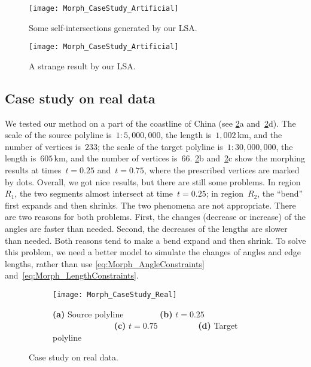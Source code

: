 \begin{figure}[tb]
	\centering	
	\texttt{[image: Morph\_CaseStudy\_Artificial]}
	\caption{Some self-intersections generated by our LSA.}
	\label{fig:Morph_DataComplex}
\par\vspace{\intextsep} %
	\centering	
	\texttt{[image: Morph\_CaseStudy\_Artificial]}
	\caption{A strange result by our LSA.}
	\label{fig:Morph_ExtraVertices}
\end{figure}

\subsection{Case study on real data}
\label{sec:Morph_CaseStudy}

We tested our method on a part of the coastline of China 
(see \figs\ref{fig:Morph_RealData}a 
and~\ref{fig:Morph_RealData}d). 
The scale of the source polyline is~$1:5{,}000{,}000$,
the length is~$1{,}002\,$km, 
and the number of vertices is~$233$; 
the scale of the target polyline is~$1:30{,}000{,}000$, 
the length is~$605\,$km, 
and the number of vertices is~$66$. 
%
\figs\ref{fig:Morph_RealData}b and~\ref{fig:Morph_RealData}c
show the morphing results
at times~$t = 0.25$ and~$t = 0.75$,
where the prescribed vertices are marked by dots. 
Overall, we got nice results, 
but there are still some problems. 
In region~$R_{1}$, the two segments almost 
intersect at time~$t = 0.25$; 
in region~$R_{2}$, 
the ``bend'' first expands and then shrinks. 
The two phenomena are not appropriate. 
There are two reasons for both problems. 
First, the changes (decrease or increase) of the angles 
are faster than needed. 
Second, the decreases of the lengths are slower than needed. 
Both reasons tend to make a bend expand and then shrink. 
To solve this problem, we need a better model to 
simulate the changes of angles and edge lengths,
rather than use \eqs\ref{eq:Morph_AngleConstraints}
and~\ref{eq:Morph_LengthConstraints}.

\begin{figure}[tb]
	\captionsetup[subfigure]
	{justification=centering,font=normalsize}
	\begin{subfigure}[b]{\textwidth}
		\centering
		\texttt{[image: Morph\_CaseStudy\_Real]}
		\caption{
			\textbf{(a)} Source polyline~~~~~~~~
			\textbf{(b)} $t=0.25$~~~~~~~~~~~~~~
			\textbf{(c)} $t=0.75$~~~~~~~~~
			\textbf{(d)} Target polyline}
	\end{subfigure}
	\caption{Case study on real data.}
	\label{fig:Morph_RealData}
\end{figure}

